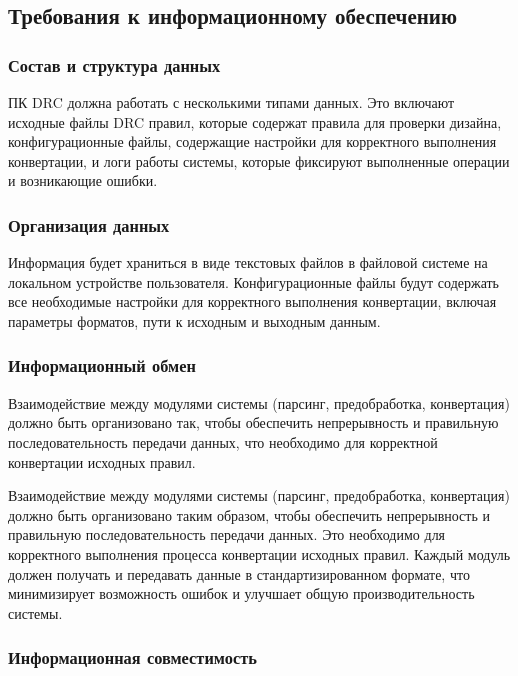 
\subsection{Требования к информационному обеспечению}

\subsubsection{Состав и структура данных}

ПК DRC должна работать с несколькими типами данных.
Это включают исходные файлы DRC правил,
которые содержат правила для проверки дизайна,
конфигурационные файлы, содержащие настройки
для корректного выполнения конвертации, и логи работы системы,
которые фиксируют выполненные операции и возникающие ошибки.

\subsubsection{Организация данных}

Информация будет храниться в виде текстовых файлов в файловой системе
на локальном устройстве пользователя.
Конфигурационные файлы будут содержать
все необходимые настройки для корректного выполнения конвертации,
включая параметры форматов, пути к исходным и выходным данным.

\subsubsection{Информационный обмен}

Взаимодействие между модулями системы (парсинг, предобработка, конвертация)
должно быть организовано так, чтобы обеспечить непрерывность
и правильную последовательность передачи данных,
что необходимо для корректной конвертации исходных правил.

Взаимодействие между модулями системы (парсинг, предобработка, конвертация)
должно быть организовано таким образом, чтобы обеспечить непрерывность
и правильную последовательность передачи данных.
Это необходимо
для корректного выполнения процесса конвертации исходных правил.
Каждый модуль должен получать
и передавать данные в стандартизированном формате,
что минимизирует возможность ошибок
и улучшает общую производительность системы.

\subsubsection{Информационная совместимость}

